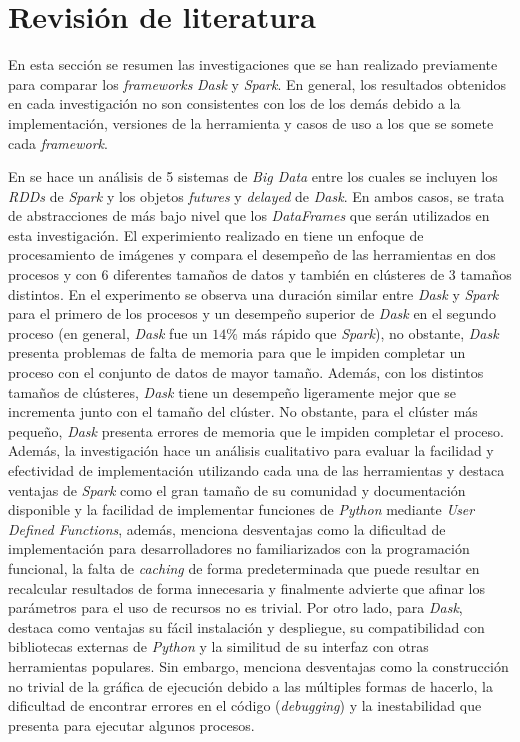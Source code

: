 \chapter{Revisión de literatura}

\noindent En esta sección se resumen las investigaciones que se han realizado previamente para comparar los \textit{frameworks} \textit{Dask} y \textit{Spark}. En general, los resultados obtenidos en cada investigación no son consistentes con los de los demás debido a la implementación, versiones de la herramienta y casos de uso a los que se somete cada \textit{framework}.

En \cite{comparative-evolution} se hace un análisis de 5 sistemas de \textit{Big Data} entre los cuales se incluyen los \textit{RDDs} de \textit{Spark} y los objetos \textit{futures} y \textit{delayed} de \textit{Dask}. En ambos casos, se trata de abstracciones de más bajo nivel que los \textit{DataFrames} que serán utilizados en esta investigación. El experimiento realizado en \cite{comparative-evolution} tiene un enfoque de procesamiento de imágenes y compara el desempeño de las herramientas en dos procesos y con 6 diferentes tamaños de datos y también en clústeres de 3 tamaños distintos. En el experimento se observa una duración similar entre \textit{Dask} y \textit{Spark} para el primero de los procesos y un desempeño superior de \textit{Dask} en el segundo proceso (en general, \textit{Dask} fue un $14\%$ más rápido que \textit{Spark}), no obstante, \textit{Dask} presenta problemas de falta de memoria para que le impiden completar un proceso con el conjunto de datos de mayor tamaño. Además, con los distintos tamaños de clústeres, \textit{Dask} tiene un desempeño ligeramente mejor que se incrementa junto con el tamaño del clúster. No obstante, para el clúster más pequeño, \textit{Dask} presenta errores de memoria que le impiden completar el proceso. Además, la investigación hace un análisis cualitativo para evaluar la facilidad y efectividad de implementación utilizando cada una de las herramientas y destaca ventajas de \textit{Spark} como el gran tamaño de su comunidad y documentación disponible y la facilidad de implementar funciones de \textit{Python} mediante \textit{User Defined Functions}, además, menciona desventajas como la dificultad de implementación para desarrolladores no familiarizados con la programación funcional, la falta de \textit{caching} de forma predeterminada que puede resultar en recalcular resultados de forma innecesaria y finalmente advierte que afinar los parámetros para el uso de recursos no es trivial. Por otro lado, para \textit{Dask}, destaca como ventajas su fácil instalación y despliegue, su compatibilidad con bibliotecas externas de \textit{Python} y la similitud de su interfaz con otras herramientas populares. Sin embargo, menciona desventajas como la construcción no trivial de la gráfica de ejecución debido a las múltiples formas de hacerlo, la dificultad de encontrar errores en el código (\textit{debugging}) y la inestabilidad que presenta para ejecutar algunos procesos.

